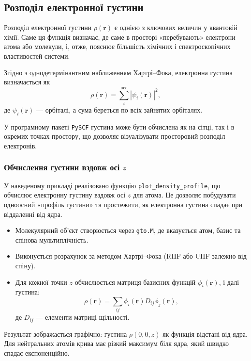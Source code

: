 \subsection{Розподіл електронної густини}

Розподіл електронної густини $\rho(\mathbf{r})$ є однією з ключових величин у квантовій хімії.
Саме ця функція визначає, де саме в просторі «перебувають» електрони атома або молекули, і, отже, пояснює більшість хімічних і спектроскопічних властивостей системи.

Згідно з однодетермінантним наближенням Хартрі–Фока, електронна густина визначається як
\[
    \rho(\mathbf{r}) = \sum_{i}^{\text{occ}} |\psi_i(\mathbf{r})|^2,
\]
де $\psi_i(\mathbf{r})$ --- орбіталі, а сума береться по всіх зайнятих орбіталях.

У програмному пакеті \texttt{PySCF} густина може бути обчислена як на сітці, так і в окремих точках простору, що дозволяє візуалізувати просторовий розподіл електронів.

\subsubsection{Обчислення густини вздовж осі $z$}

У наведеному прикладі реалізовано функцію \texttt{plot\_density\_profile}, що обчислює електронну густину вздовж осі $z$ для атома.
Це дозволяє побудувати одноосний «профіль густини» та простежити, як електронна густина спадає при віддаленні від ядра.

\begin{itemize}
    \item Молекулярний об’єкт створюється через \texttt{gto.M}, де вказується атом, базис та спінова мультиплічність.
    \item Виконується розрахунок за методом Хартрі–Фока (RHF або UHF залежно від спіну).
    \item Для кожної точки $z$ обчислюється матриця базисних функцій $\phi_i(\mathbf{r})$, і далі густина:
          \[
              \rho(\mathbf{r}) = \sum_{ij} \phi_i(\mathbf{r}) D_{ij} \phi_j(\mathbf{r}),
          \]
          де $D_{ij}$ --- елементи матриці щільності.
\end{itemize}

Результат зображається графічно: густина $\rho(0,0,z)$ як функція відстані від ядра.
Для нейтральних атомів крива має різкий максимум біля ядра, який швидко спадає експоненційно.

